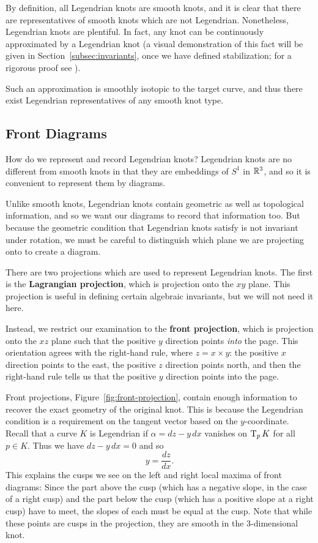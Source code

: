 By definition, all Legendrian knots are smooth knots, and it is clear that there are representatives of smooth knots which are not Legendrian. Nonetheless, Legendrian knots are plentiful. In fact, any knot can be continuously approximated by a Legendrian knot (a visual demonstration of this fact will be given in Section~\ref{subsec:invariants}, once we have defined stabilization; for a rigorous proof see \cite{geiges}).

Such an approximation is smoothly isotopic to the target curve, and thus there exist Legendrian representatives of any smooth knot type.

\subsection{Front Diagrams}

How do we represent and record Legendrian knots? Legendrian knots are no different from smooth knots in that they are embeddings of $S^1$ in $\mathbb{R}^3$, and so it is convenient to represent them by diagrams.

Unlike smooth knots, Legendrian knots contain geometric as well as topological information, and so we want our diagrams to record that information too. But because the geometric condition that Legendrian knots satisfy is not invariant under rotation, we must be careful to distinguish which plane we are projecting onto to create a diagram.

There are two projections which are used to represent Legendrian knots. The first is the \textbf{Lagrangian projection}, which is projection onto the $xy$ plane. This projection is useful in defining certain algebraic invariants, but we will not need it here.

Instead, we restrict our examination to the \textbf{front projection}, which is projection onto the $xz$ plane such that the positive $y$ direction points \emph{into} the page. This orientation agrees with the right-hand rule, where $z = x \times y$: the positive $x$ direction points to the east, the positive $z$ direction points north, and then the right-hand rule tells us that the positive $y$ direction points into the page.

Front projections, Figure~\ref{fig:front-projection}, contain enough information to recover the exact geometry of the original knot. This is because the Legendrian condition is a requirement on the tangent vector based on the $y$-coordinate. Recall that a curve $K$ is Legendrian if ${\alpha = dz - y\, dx}$ vanishes on $\operatorname{T}_p K$ for all $p \in K$. Thus we have ${dz - y \, dx = 0}$ and so
\[
    y = \frac{dz}{dx}.
\]
This explains the cusps we see on the left and right local maxima of front diagrams: Since the part above the cusp (which has a negative slope, in the case of a right cusp) and the part below the cusp (which has a positive slope at a right cusp) have to meet, the slopes of each must be equal at the cusp. Note that while these points are cusps in the projection, they are smooth in the 3-dimensional knot.

